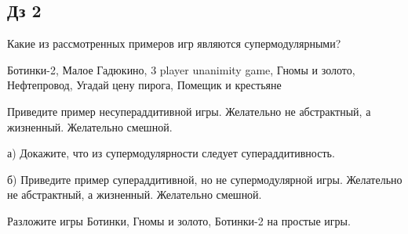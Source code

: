 \subsection{Дз 2}

\vspace{5pt} 

Какие из рассмотренных примеров игр являются супермодулярными?

Ботинки-2, Малое Гадюкино, 3 player unanimity game, Гномы и золото, Нефтепровод, Угадай цену пирога, Помещик и крестьяне


\vspace{5pt} 

Приведите пример несупераддитивной игры. Желательно не абстрактный, а жизненный. Желательно смешной.


\vspace{5pt} 

а) Докажите, что из супермодулярности следует супераддитивность.

б) Приведите пример супераддитивной, но не супермодулярной игры. Желательно не абстрактный, а жизненный. Желательно смешной.


\vspace{5pt} 

Разложите игры Ботинки, Гномы и золото, Ботинки-2 на простые игры.

